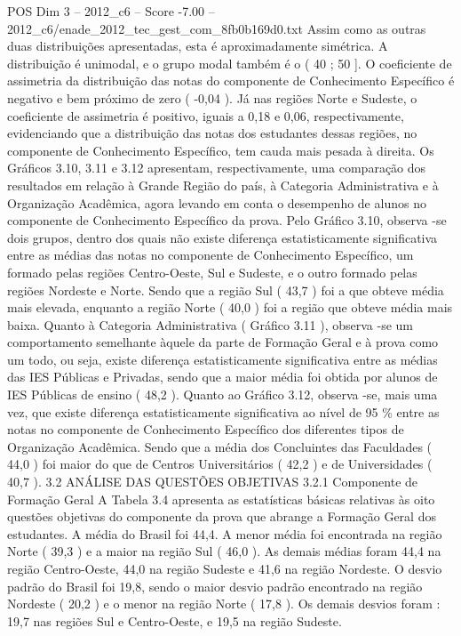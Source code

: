 \begin{textsample}{POS Dim 3 – 2012\_c6 – Score -7.00 – 2012\_c6/enade\_2012\_tec\_gest\_com\_8fb0b169d0.txt}
Assim como as outras duas distribuições apresentadas, esta é aproximadamente simétrica.
A distribuição é unimodal, e o grupo modal também é o ( 40 ; 50 ].
O coeficiente de assimetria da distribuição das notas do componente de Conhecimento Específico é negativo e bem próximo de zero ( -0,04 ).
Já nas regiões Norte e Sudeste, o coeficiente de assimetria é positivo, iguais a 0,18 e 0,06, respectivamente, evidenciando que a distribuição das notas dos estudantes dessas regiões, no componente de Conhecimento Específico, tem cauda mais pesada à direita.
Os Gráficos 3.10, 3.11 e 3.12 apresentam, respectivamente, uma comparação dos resultados em relação à Grande Região do país, à Categoria Administrativa e à Organização Acadêmica, agora levando em conta o desempenho de alunos no componente de Conhecimento Específico da prova.
Pelo Gráfico 3.10, observa -se dois grupos, dentro dos quais não existe diferença estatisticamente significativa entre as médias das notas no componente de Conhecimento Específico, um formado pelas regiões Centro-Oeste, Sul e Sudeste, e o outro formado pelas regiões Nordeste e Norte.
Sendo que a região Sul ( 43,7 ) foi a que obteve média mais elevada, enquanto a região Norte ( 40,0 ) foi a região que obteve média mais baixa.
Quanto à Categoria Administrativa ( Gráfico 3.11 ), observa -se um comportamento semelhante àquele da parte de Formação Geral e à prova como um todo, ou seja, existe diferença estatisticamente significativa entre as médias das IES Públicas e Privadas, sendo que a maior média foi obtida por alunos de IES Públicas de ensino ( 48,2 ).
Quanto ao Gráfico 3.12, observa -se, mais uma vez, que existe diferença estatisticamente significativa ao nível de 95 \% entre as notas no componente de Conhecimento Específico dos diferentes tipos de Organização Acadêmica.
Sendo que a média dos Concluintes das Faculdades ( 44,0 ) foi maior do que de Centros Universitários ( 42,2 ) e de Universidades ( 40,7 ). 3.2 ANÁLISE DAS QUESTÕES OBJETIVAS 3.2.1 Componente de Formação Geral A Tabela 3.4 apresenta as estatísticas básicas relativas às oito questões objetivas do componente da prova que abrange a Formação Geral dos estudantes.
A média do Brasil foi 44,4.
A menor média foi encontrada na região Norte ( 39,3 ) e a maior na região Sul ( 46,0 ).
As demais médias foram 44,4 na região Centro-Oeste, 44,0 na região Sudeste e 41,6 na região Nordeste.
O desvio padrão do Brasil foi 19,8, sendo o maior desvio padrão encontrado na região Nordeste ( 20,2 ) e o menor na região Norte ( 17,8 ).
Os demais desvios foram : 19,7 nas regiões Sul e Centro-Oeste, e 19,5 na região Sudeste.

\end{textsample}
